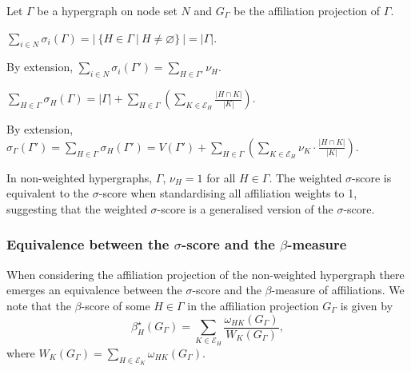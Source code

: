\begin{property} \label{prop:norm}
Let $\Gamma$ be a hypergraph on node set $N$ and $G_{\Gamma}$ be the affiliation projection of $\Gamma$.
\begin{abet}
\item $\sum_{i \in N} \sigma_{i}(\Gamma) = | ~ \{ H \in \Gamma~|~H \neq \varnothing \} ~ | = | \Gamma |$.

By extension, $\sum_{i \in N} \sigma_{i}(\Gamma') = \sum_{H \in \Gamma'} \nu_{H}$.

\item $\sum_{H \in \Gamma} \sigma_{H}(\Gamma) = | \Gamma | + \sum_{H \in \Gamma} \left( \sum_{K \in \mathcal{E}_{H}} \frac{| H \cap K |}{|K|} \right)$.

By extension, $\sigma_{\Gamma}(\Gamma') = \sum_{H \in \Gamma} \sigma_{H}(\Gamma') = V(\Gamma') + \sum_{H \in \Gamma} \left( \sum_{K \in \mathcal{E}_{H}} \nu_{K} \cdot \frac{| H \cap K |}{|K|} \right) $.

\end{abet}
\end{property}

In non-weighted hypergraphs, $\Gamma$, $\nu_{H} = 1$ for all $H \in \Gamma$. The weighted $\sigma$-score is equivalent to the $\sigma$-score when standardising all affiliation weights to 1, suggesting that the weighted $\sigma$-score is a generalised version of the $\sigma$-score.

\subsubsection*{Equivalence between the $\sigma$-score and the $\beta$-measure}

When considering the affiliation projection of the non-weighted hypergraph there emerges an equivalence between the $\sigma$-score and the $\beta$-measure of affiliations. We note that the $\beta$-score of some $H \in \Gamma$ in the affiliation projection $G_{\Gamma}$ is given by
\begin{equation}
\beta^{\star}_{H}(G_{\Gamma}) = \sum_{K \in \mathcal{E}_{H}} \frac{\omega_{HK}(G_{\Gamma})}{W_{K}(G_{\Gamma})} ,
\end{equation}
where $W_{K}(G_{\Gamma}) = \sum_{H \in \mathcal{E}_{K}} \omega_{HK} (G_{\Gamma})$.

